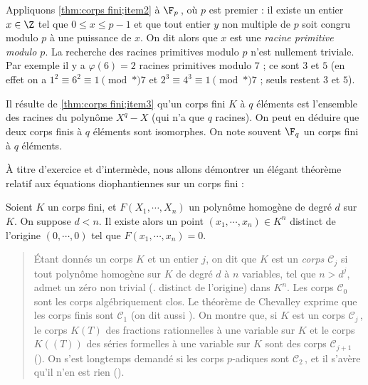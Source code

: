 \documentclass[11pt, useosf,
  title in boldface,
  theorem in new line,
  theorem numbering = section,
  number theorems separately,
]{simplivre}
\begin{document}
    \begin{example}
        Appliquons \ref{thm:corps fini;item2} à \( \F_p \)\,, où \( p \) est premier : il existe un entier \( x \in \Z \) tel que \( 0 \leqslant x \leqslant p-1 \) et que tout entier \( y \) non multiple de \( p \) soit congru modulo \( p \) à une puissance de \( x \). On dit alors que \( x \) est une \emph{racine primitive modulo \( p \)}. La recherche des racines primitives modulo \( p \) n'est nullement triviale. Par exemple il y a \( \varphi(6) = 2 \) racines primitives modulo \( 7 \) ; ce sont \( 3 \) et \( 5 \) (en effet on a \( 1^2 \equiv 6^2 \equiv 1 \pmod*{7} \) et \( 2^3 \equiv 4^3\equiv 1 \pmod*{7} \) ; seuls restent \( 3 \) et \( 5 \)).
    \end{example}

    \begin{remark}
        Il résulte de \ref{thm:corps fini;item3} qu'un corps fini \( K \) à \( q \) éléments est l'ensemble des racines du polynôme \( X^q - X \) (qui n'a que \( q \) racines). On peut en déduire que deux corps finis à \( q \) éléments sont isomorphes. On note souvent \( \F_q \) un corps fini à \( q \) éléments.
    \end{remark}

    À titre d'exercice et d'intermède, nous allons démontrer un élégant théorème relatif aux équations diophantiennes sur un corps fini :

    \begin{theorem}[Chevalley]\label{thm:Chevalley;corps fini}
        Soient \( K \) un corps fini, et \( F(X_1, \cdots, X_n) \) un polynôme homogène de degré \( d \) sur \( K \). On suppose \( d < n \). Il existe alors un point \( (x_1, \cdots, x_n) \in K^n \) distinct de l'origine \( (0, \cdots, 0) \) tel que \( F(x_1, \cdots, x_n) = 0 \).
    \end{theorem}

    \begin{quote}
        Étant donnés un corps \( K \) et un entier \( j \), on dit que \( K \) est un \emph{corps \( \mathscr{C}_j \)} si tout polynôme homogène sur \( K \) de degré \( d \) à \( n \) variables, tel que \( n > d^j \), admet un zéro non trivial (\ie. distinct de l'origine) dans \( K^n \). Les corps \( \mathscr{C}_0 \) sont les corps algébriquement clos. Le théorème de Chevalley exprime que les corps finis sont \( \mathscr{C}_1 \) (on dit aussi ). On montre que, si \( K \) est un corps \( \mathscr{C}_j \)\,, le corps \( K(T) \) des fractions rationnelles à une variable sur \( K \) et le corps \( K(\!\!(T)\!\!) \) des séries formelles à une variable sur \( K \) sont des corps \( \mathscr{C}_{j+1} \) (\cite{lang1962}). On s'est longtemps demandé si les corps \( p \)‑adiques sont \( \mathscr{C}_2 \)\,, et il s'avère qu'il n'en est rien (\cite{terjanian1966}).
    \end{quote}
\end{document}
